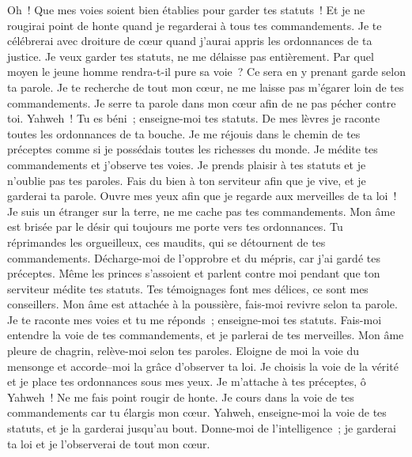 \begin{multicols}{2}
Oh~! Que mes voies soient bien établies pour garder tes statuts~!
Et je ne rougirai point de honte quand je regarderai à tous tes commandements.
Je te célébrerai avec droiture de cœur quand j'aurai appris les ordonnances de ta justice.
Je veux garder tes statuts, ne me délaisse pas entièrement.
 Par quel moyen le jeune homme rendra-t-il pure sa voie~? Ce sera en y prenant garde selon ta parole.
Je te recherche de tout mon cœur, ne me laisse pas m'égarer loin de tes commandements.
Je serre ta parole dans mon cœur afin de ne pas pécher contre toi.
Yahweh~! Tu es béni~; enseigne-moi tes statuts.
De mes lèvres je raconte toutes les ordonnances de ta bouche.
Je me réjouis dans le chemin de tes préceptes comme si je possédais toutes les richesses du monde.
Je médite tes commandements et j'observe tes voies.
Je prends plaisir à tes statuts et je n'oublie pas tes paroles.
 Fais du bien à ton serviteur afin que je vive, et je garderai ta parole.
Ouvre mes yeux afin que je regarde aux merveilles de ta loi~!
Je suis un étranger sur la terre, ne me cache pas tes commandements.
Mon âme est brisée par le désir qui toujours me porte vers tes ordonnances.
Tu réprimandes les orgueilleux, ces maudits, qui se détournent de tes commandements.
Décharge-moi de l'opprobre et du mépris, car j'ai gardé tes préceptes.
Même les princes s'assoient et parlent contre moi pendant que ton serviteur médite tes statuts.
Tes témoignages font mes délices, ce sont mes conseillers.
 Mon âme est attachée à la poussière, fais-moi revivre selon ta parole.
Je te raconte mes voies et tu me réponds~; enseigne-moi tes statuts.
Fais-moi entendre la voie de tes commandements, et je parlerai de tes merveilles.
Mon âme pleure de chagrin, relève-moi selon tes paroles.
Eloigne de moi la voie du mensonge et accorde–moi la grâce d'observer ta loi.
Je choisis la voie de la vérité et je place tes ordonnances sous mes yeux.
Je m'attache à tes préceptes, ô Yahweh~! Ne me fais point rougir de honte.
Je cours dans la voie de tes commandements car tu élargis mon cœur.
 Yahweh, enseigne-moi la voie de tes statuts, et je la garderai jusqu'au bout.
Donne-moi de l'intelligence~; je garderai ta loi et je l'observerai de tout mon cœur.

\end{multicols}
